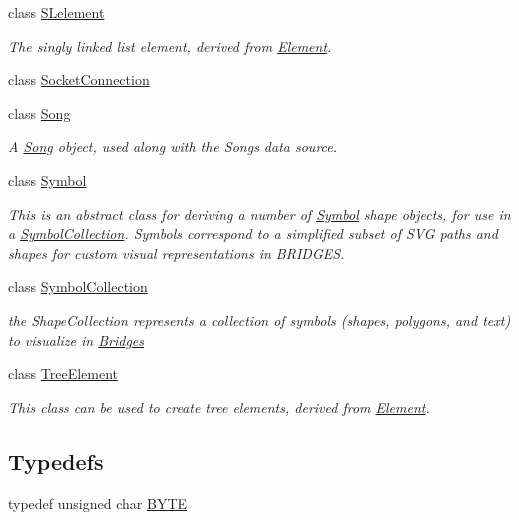 \begin{DoxyCompactItemize}
class \mbox{\hyperlink{classbridges_1_1_s_lelement}{S\+Lelement}}
\begin{DoxyCompactList}\small\item\em The singly linked list element, derived from \mbox{\hyperlink{classbridges_1_1_element}{Element}}. \end{DoxyCompactList}\item 
class \mbox{\hyperlink{classbridges_1_1_socket_connection}{Socket\+Connection}}
\item 
class \mbox{\hyperlink{classbridges_1_1_song}{Song}}
\begin{DoxyCompactList}\small\item\em A \mbox{\hyperlink{classbridges_1_1_song}{Song}} object, used along with the Songs data source. \end{DoxyCompactList}\item 
class \mbox{\hyperlink{classbridges_1_1_symbol}{Symbol}}
\begin{DoxyCompactList}\small\item\em This is an abstract class for deriving a number of \mbox{\hyperlink{classbridges_1_1_symbol}{Symbol}} shape objects, for use in a \mbox{\hyperlink{classbridges_1_1_symbol_collection}{Symbol\+Collection}}. Symbols correspond to a simplified subset of S\+VG paths and shapes for custom visual representations in B\+R\+I\+D\+G\+ES. \end{DoxyCompactList}\item 
class \mbox{\hyperlink{classbridges_1_1_symbol_collection}{Symbol\+Collection}}
\begin{DoxyCompactList}\small\item\em the Shape\+Collection represents a collection of symbols (shapes, polygons, and text) to visualize in \mbox{\hyperlink{classbridges_1_1_bridges}{Bridges}} \end{DoxyCompactList}\item 
class \mbox{\hyperlink{classbridges_1_1_tree_element}{Tree\+Element}}
\begin{DoxyCompactList}\small\item\em This class can be used to create tree elements, derived from \mbox{\hyperlink{classbridges_1_1_element}{Element}}. \end{DoxyCompactList}\end{DoxyCompactItemize}
\subsection*{Typedefs}
\begin{DoxyCompactItemize}
\item 
typedef unsigned char \mbox{\hyperlink{namespacebridges_a59b77ee45243ba85c701fb8ab298ef00}{B\+Y\+TE}}
\end{DoxyCompactItemize}
